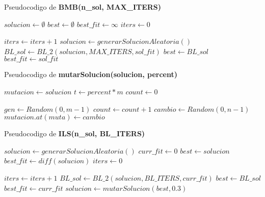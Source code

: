      Pseudocodigo de \textbf{BMB(n\_sol, MAX\_ITERS)}
     \begin{algorithm}[H]
       \begin{algorithmic}[1]
          \State $solucion \gets \emptyset$
          \State $best \gets \emptyset$
          \State $best\_fit \gets \infty$
          \State $iters \gets 0$

            \State $iters \gets iters + 1$
            \State $solucion \gets generarSolucionAleatoria()$
            \State $BL\_sol \gets BL\_2(solucion, MAX\_ITERS, sol\_fit)$
              \State $best \gets BL\_sol$
              \State $best\_fit \gets sol\_fit$
            \EndIf
          \EndWhile
          \State {}
         \EndFunction
       \end{algorithmic}
     \end{algorithm}

     Pseudocodigo de \textbf{mutarSolucion(solucion, percent)}
     \begin{algorithm}[H]
       \begin{algorithmic}[1]
          \State $mutacion \gets solucion$
          \State $t \gets percent*m$
          \State $count \gets 0$

            \State $gen \gets Random(0,m-1)$
            \State $count \gets count + 1$
            \State $cambio \gets Random(0,n-1)$ 
            \State $mutacion.at(muta) \gets cambio$
          \EndWhile
          \State {}
         \EndFunction
       \end{algorithmic}
     \end{algorithm}

     Pseudocodigo de \textbf{ILS(n\_sol, BL\_ITERS)}
     \begin{algorithm}[H]
       \begin{algorithmic}[1]
          \State $solucion \gets generarSolucionAleatoria()$
          \State $curr\_fit \gets 0$
          \State $best \gets solucion$
          \State $best\_fit \gets diff(solucion)$
          \State $iters \gets 0$

            \State $ iters \gets iters + 1$
            \State $BL\_sol \gets BL\_2(solucion,BL\_ITERS,curr\_fit)$ 
              \State $best \gets BL\_sol$
              \State $best\_fit \gets curr\_fit$
            \EndIf
            \State $solucion \gets mutarSolucion(best,0.3)$
            \EndWhile
          \State {}
         \EndFunction
       \end{algorithmic}
     \end{algorithm}

